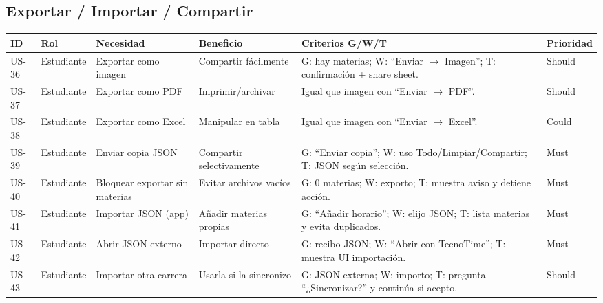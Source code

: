 \medskip

\subsection{Exportar / Importar / Compartir}
\small
\captionsetup{type=table}
\label{tab:hu_export}
\begin{tabularx}{\linewidth}{@{}P{1.15cm}P{2.3cm}XP{2.3cm}XP{1.2cm}@{}}
\toprule
ID & Rol & Necesidad & Beneficio & Criterios G/W/T & Prioridad \\
\midrule
US-36 & Estudiante & Exportar como imagen & Compartir fácilmente & G: hay materias; W: ``Enviar $\rightarrow$ Imagen''; T: confirmación + share sheet. & Should \\
US-37 & Estudiante & Exportar como PDF & Imprimir/archivar & Igual que imagen con ``Enviar $\rightarrow$ PDF''. & Should \\
US-38 & Estudiante & Exportar como Excel & Manipular en tabla & Igual que imagen con ``Enviar $\rightarrow$ Excel''. & Could \\
US-39 & Estudiante & Enviar copia JSON & Compartir selectivamente & G: ``Enviar copia''; W: uso Todo/Limpiar/Compartir; T: JSON según selección. & Must \\
US-40 & Estudiante & Bloquear exportar sin materias & Evitar archivos vacíos & G: 0 materias; W: exporto; T: muestra aviso y detiene acción. & Must \\
US-41 & Estudiante & Importar JSON (app) & Añadir materias propias & G: ``Añadir horario''; W: elijo JSON; T: lista materias y evita duplicados. & Must \\
US-42 & Estudiante & Abrir JSON externo & Importar directo & G: recibo JSON; W: ``Abrir con TecnoTime''; T: muestra UI importación. & Must \\
US-43 & Estudiante & Importar otra carrera & Usarla si la sincronizo & G: JSON externa; W: importo; T: pregunta “¿Sincronizar?” y continúa si acepto. & Should \\
\bottomrule
\end{tabularx}
\normalsize

\medskip

